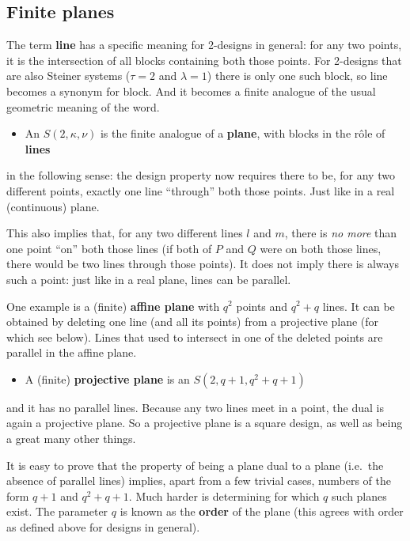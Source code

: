 \documentclass[12pt]{article}
\begin{document}
\clearpage
\subsection*{Finite planes}

The term {\bf line} has a specific meaning for 2-designs in general: for any two points, it is the intersection of all blocks containing both those points.  For 2-designs that are also Steiner systems ($\tau=2$ and $\lambda=1$) there
is only one such block, so line becomes a synonym for block. And it becomes a finite analogue of the usual geometric meaning of the word.
%
\begin{itemize}
\item An $S(2,\kappa,\nu)$ is the finite analogue of a {\bf plane}, with blocks in the r\^ole of {\bf lines}
\end{itemize}
%
in the following sense: the design property now requires there to be, for any two different points, exactly one line ``through'' both those points. Just like in a real (continuous) plane.

This also implies that, for any two different lines $l$ and $m$, there is {\em no more\/} than one point ``on'' both those lines (if both of $P$ and $Q$ were on both those lines, there would be two lines through those points).
It does not imply there is always such a point: just like in a real plane, lines can be parallel.

One example is a (finite) {\bf affine plane} with $q^2$ points and $q^2+q$ lines. It can be obtained by deleting one line (and all its points) from a projective plane (for which see below). Lines that used to intersect in one of the deleted points are parallel in the affine plane.
%
\begin{itemize}
\item A (finite) {\bf projective plane} is an $S(2, q+1, q^2+q+1)$
\end{itemize}
%
and it has no parallel lines. Because any two lines meet in a point, the dual is again a projective plane. So a projective plane is a square design, as well as being a great many other things.

It is easy to prove that the property of being a plane dual to a plane (i.e.\ the absence of parallel lines) implies, apart from a few trivial cases, numbers of the form $q+1$ and $q^2+q+1$. Much harder is determining for which $q$
such planes exist. The parameter $q$ is known as the {\bf order} of the plane (this agrees with order as defined above for designs in general).
\end{document}
